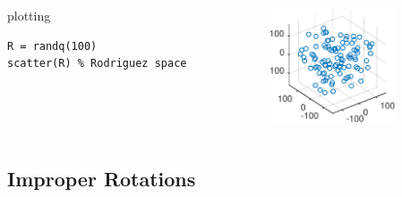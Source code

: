 \documentclass[compress]{beamer}
\begin{document}
\begin{frame}[fragile]
\begin{columns}
\begin{column}{8cm}
\begin{overlayarea}{8cm}{8cm}
plotting
\begin{lstlisting}[style=input]
R = randq(100)
scatter(R) % Rodriguez space
\end{lstlisting}

\end{overlayarea}
\end{column}

\begin{column}{3.7cm}
  \includegraphics[width=3.7cm]{pic/rotationScatter}
\end{column}

\end{columns}

\end{frame}

\subsection*{Improper Rotations}
\end{document}
